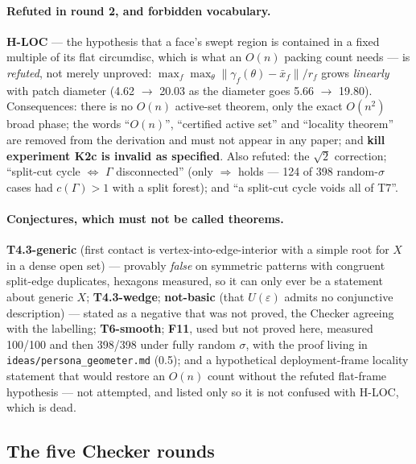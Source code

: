 \documentclass[10pt,a4paper]{article}
\newcommand{\fn}[1]{\nolinkurl{#1}}
\begin{document}
\paragraph{Refuted in round 2, and forbidden vocabulary.}
\textbf{H-LOC} --- the hypothesis that a face's swept region is contained in a fixed multiple of
its flat circumdisc, which is what an $O(n)$ packing count needs --- is \emph{refuted}, not
merely unproved: $\max_f\max_\theta\|\gamma_f(\theta)-\bar x_f\|/r_f$ grows \emph{linearly} with
patch diameter (4.62 $\to$ 20.03 as the diameter goes 5.66 $\to$ 19.80). Consequences: there is
no $O(n)$ active-set theorem, only the exact $O(n^2)$ broad phase; the words ``$O(n)$'',
``certified active set'' and ``locality theorem'' are removed from the derivation and must not
appear in any paper; and \textbf{kill experiment K2c is invalid as specified}. Also refuted: the
$\sqrt2$ correction; ``split-cut cycle $\Leftrightarrow$ $\Gamma$ disconnected'' (only
$\Rightarrow$ holds --- 124 of 398 random-$\sigma$ cases had $c(\Gamma)>1$ with a split forest);
and ``a split-cut cycle voids all of T7''.

\paragraph{Conjectures, which must not be called theorems.}
\textbf{T4.3-generic} (first contact is vertex-into-edge-interior with a simple root for $X$ in
a dense open set) --- provably \emph{false} on symmetric patterns with congruent split-edge
duplicates, hexagons measured, so it can only ever be a statement about generic $X$;
\textbf{T4.3-wedge}; \textbf{not-basic} (that $U(\varepsilon)$ admits no conjunctive
description) --- stated as a negative that was not proved, the Checker agreeing with the
labelling; \textbf{T6-smooth}; \textbf{F11}, used but not proved here, measured 100/100 and then
398/398 under fully random $\sigma$, with the proof living in
\fn{ideas/persona_geometer.md} (0.5); and a hypothetical deployment-frame locality statement
that would restore an $O(n)$ count without the refuted flat-frame hypothesis --- not attempted,
and listed only so it is not confused with H-LOC, which is dead.

\subsection{The five Checker rounds}
\end{document}
